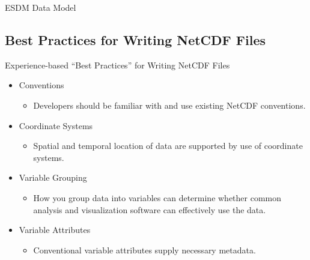 \documentclass[compress,11pt,xcolor=svgnames,aspectratio=169]{beamer}
\begin{document}
\begin{frame}[t]{ESDM Data Model}

\begin{center}
\end{center}

\end{frame}

\subsection{Best Practices for Writing NetCDF Files}

\begin{frame}[t]{Experience-based ``Best Practices'' for Writing NetCDF Files}

    \begin{itemize}
    \setlength\itemsep{0.4cm}

        \item	Conventions
        \begin{itemize}
          \item Developers should be familiar with and use existing NetCDF conventions.
        \end{itemize}

        \item	Coordinate Systems
        \begin{itemize}
          \item Spatial and temporal location of data are supported by use of coordinate systems.
        \end{itemize}

        \item	Variable Grouping
        \begin{itemize}
          \item How you group data into variables can determine whether common analysis and visualization software can effectively use the data.
        \end{itemize}

        \item	Variable Attributes
        \begin{itemize}
          \item Conventional variable attributes supply necessary metadata.
        \end{itemize}

    \end{itemize}

\nocite{netcdf}

\end{frame}
\end{document}
